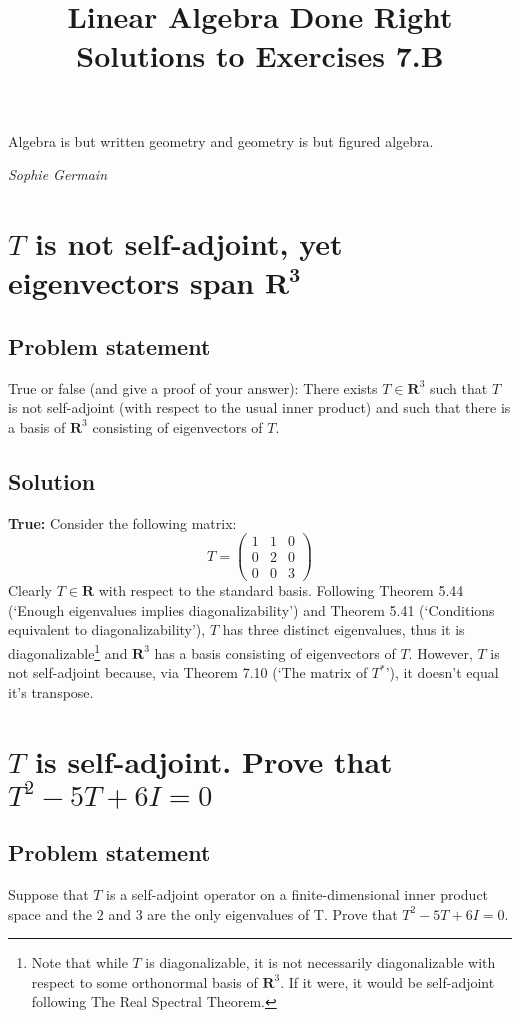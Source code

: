 \documentclass{article}
\title{Linear Algebra Done Right\\Solutions to Exercises 7.B}
\author{}
\date{}
\begin{document}
\maketitle

\epigraph{Algebra is but written geometry and geometry is but figured algebra.}{\textit{Sophie Germain}}

\section{$T$ is not self-adjoint, yet eigenvectors span $\mathbf{R^3}$}
\subsection*{Problem statement}
True or false (and give a proof of your answer): There exists $T\in\mathbf{R}^3$ such that $T$ is not self-adjoint (with respect to the usual inner product) and such that there is a basis of $\mathbf{R}^3$ consisting of eigenvectors of $T$.

\subsection*{Solution}
\textbf{True:} Consider the following matrix:
\[T = \begin{pmatrix}1 & 1 & 0 \\0 & 2 & 0 \\0 & 0 & 3\end{pmatrix}\]
Clearly $T\in\mathbf{R}$ with respect to the standard basis. Following Theorem 5.44 (`Enough eigenvalues implies diagonalizability') and Theorem 5.41 (`Conditions equivalent to diagonalizability'), $T$ has three distinct eigenvalues, thus it is diagonalizable\footnote{Note that while $T$ is diagonalizable, it is not necessarily diagonalizable with respect to some orthonormal basis of $\mathbf{R}^3$. If it were, it would be self-adjoint following The Real Spectral Theorem.} and $\mathbf{R}^3$ has a basis consisting of eigenvectors of $T$. However, $T$ is not self-adjoint because, via Theorem 7.10 (`The matrix of $T^*$'), it doesn't equal it's transpose.

\clearpage

\section{$T$ is self-adjoint. Prove that $T^2-5T+6I=0$}
\subsection*{Problem statement}
Suppose that $T$ is a self-adjoint operator on a finite-dimensional inner product space and the $2$ and $3$ are the only eigenvalues of T. Prove that $T^2-5T+6I=0$.
\end{document}

